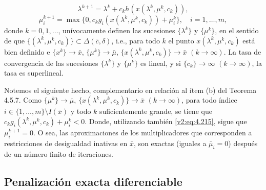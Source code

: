 \begin{theorem}
\begin{enumerate}[(a)]
\[            \lambda^{k+1} = \lambda^k + c_k h(x(\lambda^k, \mu^k, c_k)),
        \]
        \begin{equation}
            \mu_i^{k+1} = \max\{0, c_k g_i(x(\lambda^k, \mu^k, c_k)) + \mu_i^k\}, \quad i = 1, \dots, m,
            \label{v2:eq:4.215}
        \end{equation}
        donde $k = 0, 1, \dots$, unívocamente definen las sucesiones $\{\lambda^k\}$ y $\{\mu^k\}$, en el sentido de que $\{(\lambda^k, \mu^k, c_k)\} \subset \Delta(\bar{c}, \delta)$, i.e., para todo $k$ el punto $x(\lambda^k, \mu^k, c_k)$ está bien definido e $\{x^k\} \to \bar{x}$, $\{\mu^k\} \to \bar{\mu}$, $\{x(\lambda^k, \mu^k, c_k)\} \to \bar{x}$ $(k \to \infty)$. La tasa de convergencia de las sucesiones $\{\lambda^k\}$ y $\{\mu^k\}$ es lineal, y si $\{c_k\} \to \infty$ $(k \to \infty)$, la tasa es superlineal.
    \end{enumerate}
\end{theorem}


Notemos el siguiente hecho, complementario en relación al ítem (b) del Teorema 4.5.7. Como $\{\mu^k\} \to \bar{\mu}$, $\{x(\lambda^k, \mu^k, c_k)\} \to \bar{x}$ $(k \to \infty)$, para todo índice $i \in \{1, \dots, m\} \setminus I(\bar{x})$ y todo $k$ suficientemente grande, se tiene que $c_k g_i(\lambda^k, \mu^k, c_k) + \mu_i^k < 0$. Donde, utilizando también \eqref{v2:eq:4.215}, sigue que $\mu_i^{k+1} = 0$. O sea, las aproximaciones de los multiplicadores que corresponden a restricciones de desigualdad inativas en $\bar{x}$, son exactas (iguales a $\bar{\mu}_i = 0$) después de un número finito de iteraciones.

\subsection{Penalización exacta diferenciable}\label{v2:sec:4.5.5}

